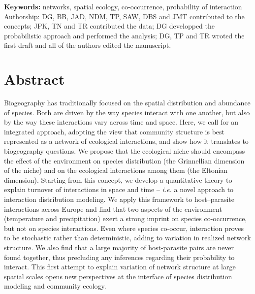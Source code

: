 \documentclass[12pt]{article}
\begin{document}
\textbf{Keywords:} networks, spatial ecology, co-occurrence, probability of interaction\\

Authorship: DG, BB, JAD, NDM, TP, SAW, DBS and JMT contributed to the
concepts; JPK, TN and TR contributed the data; DG developped the probabilistic
approach and performed the analysis; DG, TP and TR wroted the first draft and
all of the authors edited the manuscript.

\newpage
\doublespacing

\section*{Abstract}

Biogeography has traditionally focused on the spatial distribution and
abundance of species. Both are driven by the way species interact with one
another, but also by the way these interactions vary across time and space.
Here, we call for an integrated approach, adopting the view that community
structure is best represented as a network of ecological interactions, and
show how it translates to biogeography questions. We propose that the
ecological niche should encompass the effect of the environment
on species distribution (the Grinnellian dimension of the niche) and on the
ecological interactions among them (the Eltonian dimension). Starting from
this concept, we develop a quantitative theory to explain turnover of
interactions in space and time -- \emph{i.e.} a novel approach to interaction
distribution modeling. We apply this framework to host–parasite interactions
across Europe and find that two aspects of the environment (temperature and
precipitation) exert a strong imprint on species co-occurrence, but not on
species interactions. Even where species co-occur, interaction proves to be
stochastic rather than deterministic, adding to variation in realized network
structure. We also find that a large majority of host-parasite pairs are never
found together, thus precluding any inferences regarding their probability to
interact. This first attempt to explain variation of network structure at
large spatial scales opens new perspectives at the interface of species
distribution modeling and community ecology.
\end{document}
